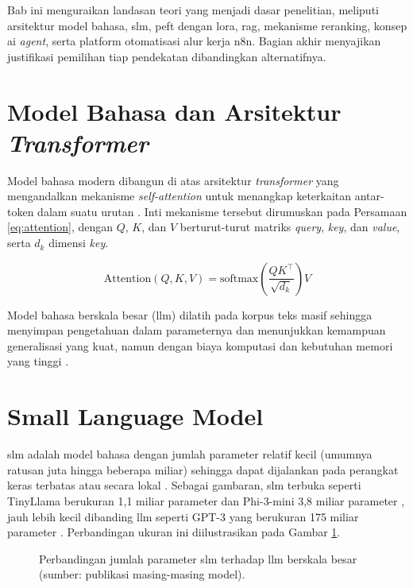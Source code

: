 Bab ini menguraikan landasan teori yang menjadi dasar penelitian, meliputi arsitektur model bahasa, \gls{slm}, \gls{peft} dengan \gls{lora}, \gls{rag}, mekanisme \gls{reranking}, konsep \gls{ai} \textit{agent}, serta platform otomatisasi alur kerja n8n. Bagian akhir menyajikan justifikasi pemilihan tiap pendekatan dibandingkan alternatifnya.

\section{Model Bahasa dan Arsitektur \textit{Transformer}}
Model bahasa modern dibangun di atas arsitektur \textit{transformer} yang mengandalkan mekanisme \textit{self-attention} untuk menangkap keterkaitan antar-token dalam suatu urutan \citep{minaee2024llmsurvey}. Inti mekanisme tersebut dirumuskan pada Persamaan \ref{eq:attention}, dengan $Q$, $K$, dan $V$ berturut-turut matriks \textit{query}, \textit{key}, dan \textit{value}, serta $d_k$ dimensi \textit{key}.

\begin{equation}
    \text{Attention}(Q, K, V) = \text{softmax}\left( \frac{QK^\top}{\sqrt{d_k}} \right) V
    \label{eq:attention}
\end{equation}

Model bahasa berskala besar (\gls{llm}) dilatih pada korpus teks masif sehingga menyimpan pengetahuan dalam parameternya dan menunjukkan kemampuan generalisasi yang kuat, namun dengan biaya komputasi dan kebutuhan memori yang tinggi \citep{minaee2024llmsurvey}.

\section{Small Language Model}
\gls{slm} adalah model bahasa dengan jumlah parameter relatif kecil (umumnya ratusan juta hingga beberapa miliar) sehingga dapat dijalankan pada perangkat keras terbatas atau secara lokal \citep{wang2025slmsurvey}. Sebagai gambaran, \gls{slm} terbuka seperti TinyLlama berukuran 1,1 miliar parameter \citep{zhang2024tinyllama} dan Phi-3-mini 3,8 miliar parameter \citep{abdin2024phi3}, jauh lebih kecil dibanding \gls{llm} seperti GPT-3 yang berukuran 175 miliar parameter \citep{hu2022lora}. Perbandingan ukuran ini diilustrasikan pada Gambar \ref{fig:ukuran-model}.

\begin{figure}[H]
    \centering
    \caption{Perbandingan jumlah parameter \gls{slm} terhadap \gls{llm} berskala besar (sumber: publikasi masing-masing model).}
    \label{fig:ukuran-model}
\end{figure}


